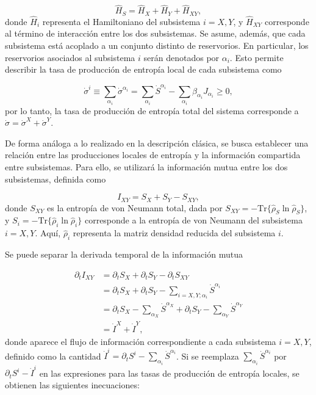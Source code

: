 \begin{equation*}
    \hat{H}_{S} = \hat{H}_{X} + \hat{H}_{Y} + \hat{H}_{XY}, 
\end{equation*}
donde $\hat{H}_{i}$ representa el Hamiltoniano del subsistema $i=X,Y$, y $\hat{H}_{XY}$ corresponde al término de interacción entre los dos subsistemas. Se asume, además, que cada subsistema está acoplado a un conjunto distinto de reservorios. En particular, los reservorios asociados al subsistema $i$ serán denotados por $\alpha_{i}$. Esto permite describir la tasa de producción de entropía local de cada subsistema como

\begin{equation*}
    \dot{\sigma}^{i} \equiv \sum_{\alpha_{i}} \dot{\sigma}^{\alpha_{i}} = \sum_{\alpha_{i}} \dot{S}^{\alpha_{i}} - \sum_{\alpha_{i}} \beta_{\alpha_{i}} J_{\alpha_{i}} \geq 0,
\end{equation*}
por lo tanto, la tasa de producción de entropía total del sistema corresponde a $\dot{\sigma} = \dot{\sigma}^{X} + \dot{\sigma}^{Y}$. 

De forma análoga a lo realizado en la descripción clásica, se busca establecer una relación entre las producciones locales de entropía y la información compartida entre subsistemas. Para ello, se utilizará la información mutua entre los dos subsistemas, definida como
 
\begin{equation*}
    I_{XY} = S_{X} + S_{Y} - S_{XY},
\end{equation*}
donde $S_{XY}$ es la entropía de von Neumann total, dada por $S_{XY} = -\mathrm{Tr}\{ \hat{\rho}_{S} \ln \hat{\rho}_{S} \}$, y $S_{i} = - \mathrm{Tr}\{ \hat{\rho}_{i} \ln \hat{\rho}_{i} \}$ corresponde a la entropía de von Neumann del subsistema $i = X, Y$. Aquí, $\hat{\rho}_{i}$ representa la matriz densidad reducida del subsistema $i$.

Se puede separar la derivada temporal de la información mutua

\begin{align*}
    \partial_{t}I_{XY} & = \partial_{t}S_{X} + \partial_{t}S_{Y} - \partial_{t}S_{XY} \\
        & = \partial_{t}S_{X} + \partial_{t}S_{Y} - \sum_{i=X,Y;\alpha_{i}}\dot{S}^{\alpha_{i}} \\
        & =  \partial_{t}S_{X} - \sum_{\alpha_{X}} \dot{S}^{\alpha_{X}} + \partial_{t}S_{Y} - \sum_{\alpha_{Y}} \dot{S}^{\alpha_{Y}} \\
        & = \dot{I}^{X} + \dot{I}^{Y},
\end{align*}
donde aparece el flujo de información correspondiente a cada subsistema $i = X, Y$, definido como la cantidad $\dot{I}^{i} = \partial_{t} S^{i} - \sum_{\alpha_{i}} \dot{S}^{\alpha_{i}}$. Si se reemplaza $\sum_{\alpha_{i}} \dot{S}^{\alpha_{i}}$ por $\partial_{t} S^{i} - \dot{I}^{i}$ en las expresiones para las tasas de producción de entropía locales, se obtienen las siguientes inecuaciones:

